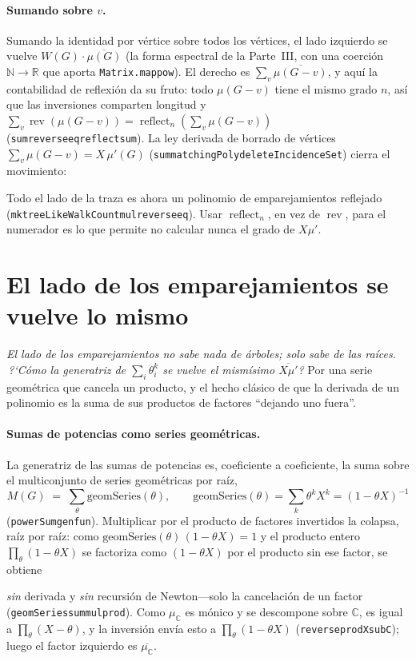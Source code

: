 \documentclass[11pt]{article}
\newcommand{\lean}[1]{{\def\_{\textunderscore\allowbreak}\texttt{#1}}}
\newcommand{\R}{\mathbb{R}}
\newcommand{\C}{\mathbb{C}}
\newcommand{\N}{\mathbb{N}}
\DeclareMathOperator{\reflect}{reflect}
\DeclareMathOperator{\rev}{rev}
\newcommand{\keyeq}[1]{\begin{center}\keybox{$\displaystyle #1$}\end{center}}
\begin{document}
\paragraph{Sumando sobre $v$.} Sumando la identidad por v\'ertice sobre todos los v\'ertices, el lado
izquierdo se vuelve $W(G)\cdot\overline{\mu(G)}$ (la forma espectral de la Parte~III, con una coerci\'on
$\N\to\R$ que aporta \lean{Matrix.map\_pow}). El derecho es $\sum_v\overline{\mu(G-v)}$, y aqu\'i la
contabilidad de reflexi\'on da su fruto: todo $\mu(G-v)$ tiene el mismo grado $n$, as\'i que las inversiones
comparten longitud y $\sum_v\rev(\mu(G-v))=\reflect_n(\sum_v\mu(G-v))$ (\lean{sum\_reverse\_eq\_reflect\_sum}).
La ley derivada de borrado de v\'ertices $\sum_v\mu(G-v)=X\,\mu'(G)$
(\lean{sum\_matchingPoly\_deleteIncidenceSet}) cierra el movimiento:
\keyeq{W(G)\cdot\overline{\mu(G)}\;=\;\overline{X\,\mu'(G)}.}
{\sloppy Todo el lado de la traza es ahora un polinomio de emparejamientos reflejado
(\lean{mk\_treeLikeWalkCount\_mul\_reverse\_eq}). Usar $\reflect_n$, en vez de $\rev$, para el numerador
es lo que permite no calcular nunca el grado de $X\mu'$.\par}

\section{El lado de los emparejamientos se vuelve lo mismo}
\label{sec:match}

\emph{El lado de los emparejamientos no sabe nada de \'arboles; solo sabe de las ra\'ices.
\,?`C\'omo la generatriz de $\sum_i\theta_i^k$ se vuelve el mism\'isimo $\overline{X\mu'}$?} Por una
serie geom\'etrica que cancela un producto, y el hecho cl\'asico de que la derivada de un polinomio es
la suma de sus productos de factores ``dejando uno fuera''.

\paragraph{Sumas de potencias como series geom\'etricas.} La generatriz de las sumas de potencias es,
coeficiente a coeficiente, la suma sobre el multiconjunto de series geom\'etricas por ra\'iz,
\[
  M(G)\;=\;\sum_{\theta}\mathrm{geomSeries}(\theta),\qquad
  \mathrm{geomSeries}(\theta)=\sum_k\theta^kX^k=(1-\theta X)^{-1}
\]
(\lean{powerSum\_genfun}). Multiplicar por el producto de factores invertidos la colapsa, ra\'iz por
ra\'iz: como $\mathrm{geomSeries}(\theta)\,(1-\theta X)=1$ y el producto entero
$\prod_\theta(1-\theta X)$ se factoriza como $(1-\theta X)$ por el producto sin ese factor, se obtiene
\keyeq{\Bigl(\sum_\theta\mathrm{geomSeries}(\theta)\Bigr)\cdot\!\prod_\theta(1-\theta X)\;=\;\sum_\theta\!\prod_{\varphi\neq\theta}(1-\varphi X)}
\emph{sin} derivada y \emph{sin} recursi\'on de Newton---solo la cancelaci\'on de un factor
(\lean{geomSeries\_sum\_mul\_prod}). Como $\mu_\C$ es m\'onico y se descompone sobre $\C$, es igual a
$\prod_\theta(X-\theta)$, y la inversi\'on env\'ia esto a $\prod_\theta(1-\theta X)$
(\lean{reverse\_prod\_X\_sub\_C}); luego el factor izquierdo es $\overline{\mu_\C}$.
\end{document}
